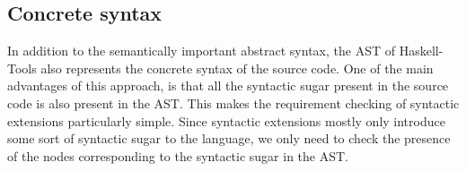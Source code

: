 \documentclass[main.tex]{subfiles}
\begin{document}
	\subsection{Concrete syntax}
	
	In addition to the semantically important abstract syntax, the AST of Haskell-Tools also represents the concrete syntax of the source code. One of the main advantages of this approach, is that all the syntactic sugar present in the source code is also present in the AST. This makes the requirement checking of syntactic extensions particularly simple. Since syntactic extensions mostly only introduce some sort of syntactic sugar to the language, we only need to check the presence of the nodes corresponding to the syntactic sugar in the AST.
	
	
\end{document}
